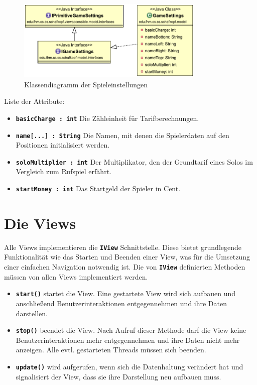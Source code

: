 \documentclass[
							a4paper, 
							11pt, 
							openany, 
							liststotoc,
							parskip=half, 
   							headings=normal
						]{scrreprt}
\begin{document}
{\begin{figure}[H]
\begin{center}
    \includegraphics[width=0.8\textwidth]{./pictures/uml/class_diagram/uml_class_settings.pdf}
	\caption[Anwendung/Model -- Klassendiagramm Spieleinstellungen]{Klassendiagramm der Spieleinstellungen} \label{fig:model_settings}
\end{center}
\end{figure}

Liste der Attribute:
\begin{itemize}
	\item \textbf{\texttt{basicCharge : int}} Die Zähleinheit für Tarifberechnungen.
	\item \textbf{\texttt{name[...] : String}} Die Namen, mit denen die Spielerdaten auf den Positionen initialisiert werden.
	\item \textbf{\texttt{soloMultiplier : int}} Der Multiplikator, den der Grundtarif eines Solos im Vergleich zum Rufspiel erfährt.
	\item \textbf{\texttt{startMoney : int}} Das Startgeld der Spieler in Cent.					
\end{itemize}

\clearpage

\section{Die Views} \label{se:anwendung_views}
Alle Views implementieren die \textbf{\texttt{IView}} Schnittstelle. Diese bietet grundlegende Funktionalität wie das Starten und Beenden einer View, was für die Umsetzung einer einfachen Navigation notwendig ist. Die von \textbf{\texttt{IView}} definierten Methoden müssen von allen Views implementiert werden.
\begin{itemize}
	\item \textbf{\texttt{start()}} startet die View. Eine gestartete View wird sich aufbauen und anschließend Benutzerinteraktionen entgegennehmen und ihre Daten darstellen.
	\item \textbf{\texttt{stop()}} beendet die View. Nach Aufruf dieser Methode darf die View keine Benutzerinteraktionen mehr entgegennehmen und ihre Daten nicht mehr anzeigen. Alle evtl. gestarteten Threads müssen sich beenden.
	\item \textbf{\texttt{update()}} wird aufgerufen, wenn sich die Datenhaltung verändert hat und signalisiert der View, dass sie ihre Darstellung neu aufbauen muss.
\end{itemize}\bigskip

}
\end{document}
